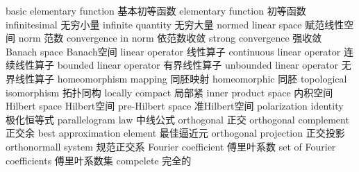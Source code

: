 {basic elementary function} 
{基本初等函数}
{elementary function} 
{初等函数}
{infinitesimal} 
{无穷小量}
{infinite quantity} 
{无穷大量}
{normed linear space} 
{赋范线性空间}
{norm} 
{范数}
{convergence in norm} 
{依范数收敛}
{strong convergence} 
{强收敛}
{Banach space} 
{Banach空间}
{linear operator} 
{线性算子}
{continuous linear operator} 
{连续线性算子}
{bounded linear operator} 
{有界线性算子}
{unbounded linear operator} 
{无界线性算子}
{homeomorphism mapping} 
{同胚映射}
{homeomorphic} 
{同胚}
{topological isomorphism} 
{拓扑同构}
{locally compact} 
{局部紧}
{inner product space}
{内积空间}
{Hilbert space} 
{Hilbert空间}
{pre-Hilbert space} 
{准Hilbert空间}
{polarization identity} 
{极化恒等式}
{parallelogram law} 
{中线公式}
{orthogonal} 
{正交}
{orthogonal complement} 
{正交余}
{best approximation element} 
{最佳逼近元}
{orthogonal projection} 
{正交投影}
{orthonormall system} 
{规范正交系}
{Fourier coefficient} 
{傅里叶系数}
{set of Fourier coefficients} 
{傅里叶系数集}
{compelete} 
{完全的}